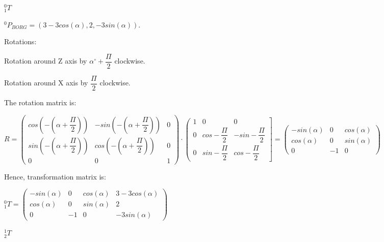 \documentclass[12pt]{article}
\begin{document}
\begin{list}{)~}{}
\item
$_{1}^{0}T$

$^0 P_{BORG} = \left(3-3cos\left(\alpha\right), 2, -3sin\left(\alpha\right)\right)$.

Rotations:

\begin{list}{)~}{}
\item Rotation around Z axis by $\alpha^\circ + \dfrac{\Pi}{2}$ clockwise.
\item Rotation around X axis by $\dfrac{\Pi}{2}$ clockwise.
\end{list}

The rotation matrix is:

$R=\left(\begin{array}{ccc}
cos\left(-\left(\alpha+\dfrac{\Pi}{2}\right)\right) & -sin\left(-\left(\alpha+\dfrac{\Pi}{2}\right)\right) & 0 \\
sin\left(-\left(\alpha+\dfrac{\Pi}{2}\right)\right) & cos\left(-\left(\alpha+\dfrac{\Pi}{2}\right)\right) & 0\\
0 & 0 & 1\end{array}\right)\cdot 
\left(\begin{array}{ccc}
1 & 0 & 0\\
0 & cos -\dfrac{\Pi}{2} & -sin -\dfrac{\Pi}{2} \\
0 & sin -\dfrac{\Pi}{2} & cos -\dfrac{\Pi}{2} \end{array}\right] = 
\left(\begin{array}{ccc}
-sin\left(\alpha\right) & 0 & cos\left(\alpha\right)\\
cos\left(\alpha\right) & 0 & sin\left(\alpha\right)\\
0 & -1 & 0\end{array}\right)$

Hence, transformation matrix is:

$_{1}^{0}T = \left(\begin{array}{cccc}
-sin\left(\alpha\right) & 0 & cos\left(\alpha\right) & 3-3cos\left(\alpha\right)\\
cos\left(\alpha\right) & 0 & sin\left(\alpha\right) & 2\\
0 & -1 & 0 & -3sin\left(\alpha\right)\end{array}\right)$

\newpage

\item
$_{2}^{1}T$


\end{list}
\end{document}
